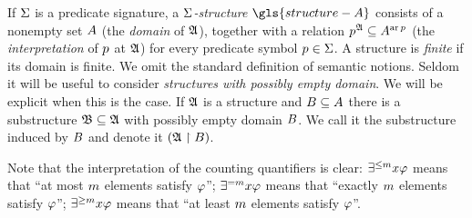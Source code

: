 
If $\mathrm{\Sigma}$ is a predicate signature, a \emph{$\mathrm{\Sigma}$-structure}
$\gls{structure-A}$ consists of a nonempty set $A$ (the \emph{domain} of
$\mathfrak{A}$), together with a relation $p^{\mathfrak{A}} \subseteq A^{\operatorname{ar}p}$ (the
\emph{interpretation} of $p$ at $\mathfrak{A}$) for every predicate symbol $p
\in \mathrm{\Sigma}$. A structure is \emph{finite} if its domain is finite.
We omit the standard definition of semantic notions.
Seldom it will be useful to consider \emph{structures with possibly empty
domain}. We will be explicit when this is the case.
If $\mathfrak{A}$ is a structure and $B \subseteq A$ there is a substructure
$\mathfrak{B} \subseteq \mathfrak{A}$ with possibly empty domain $B$. We call it the
substructure induced by $B$ and denote it $(\mathfrak{A} \restriction B)$.

Note that the interpretation of the counting quantifiers is clear:
$\exists^{\leq m}x\varphi$ means that ``at most $m$ elements satisfy $\varphi$'';
$\exists^{=m}x\varphi$ means that ``exactly $m$ elements satisfy $\varphi$'';
$\exists^{\geq m}x\varphi$ means that ``at least $m$ elements satisfy $\varphi$''.
